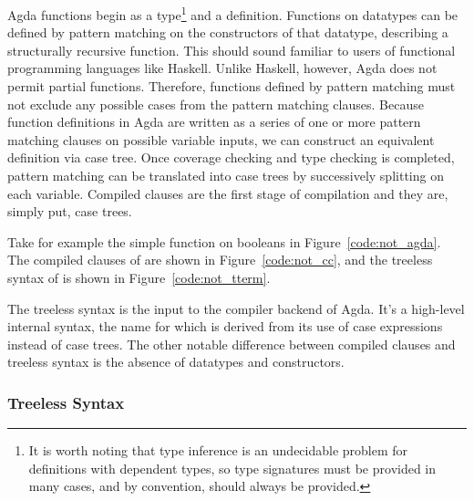 Agda functions begin as a type\footnote{It is worth noting that type inference is an undecidable problem for definitions with dependent types, so type signatures must be provided in many cases, and by convention, should always be provided.} and a definition. Functions on datatypes can be defined by pattern matching on the constructors of that datatype, describing a structurally recursive function.\cite{agdawiki} %
This should sound familiar to users of functional programming languages like Haskell. Unlike Haskell, however, Agda does not permit partial functions. Therefore, functions defined by pattern matching must not exclude any possible cases from the pattern matching clauses.\cite{agdawiki} %
Because function definitions in Agda are written as a series of one or more pattern matching clauses on possible variable inputs, we can construct an equivalent definition via case tree.\cite{agdawiki} %
Once coverage checking and type checking is completed, pattern matching can be translated into case trees by successively splitting on each variable.\cite{agdahackage} %
Compiled clauses are the first stage of compilation and they are, simply put, case trees.

Take for example the simple  function on booleans in Figure~\ref{code:not_agda}. The compiled clauses of  are shown in Figure~\ref{code:not_cc}, and the treeless syntax of  is shown in Figure~\ref{code:not_tterm}.



The treeless syntax is the input to the compiler backend of Agda. It's a high-level internal syntax, the name for which is derived from its use of case expressions instead of case trees. The other notable difference between compiled clauses and treeless syntax is the absence of datatypes and constructors.\cite{agdahackage} %

\subsubsection{Treeless Syntax}


